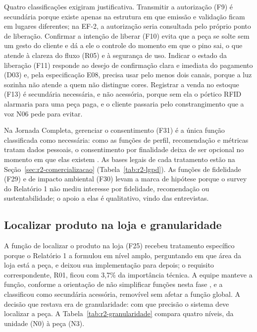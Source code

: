 Quatro classificações exigiram justificativa. Transmitir a autorização (F9) é secundária porque existe apenas na estrutura em que emissão e validação ficam em lugares diferentes; na EF-2, a autorização seria consultada pelo próprio ponto de liberação. Confirmar a intenção de liberar (F10) evita que a peça se solte sem um gesto do cliente e dá a ele o controle do momento em que o pino sai, o que atende à clareza do fluxo (R05) e à segurança de uso. Indicar o estado da liberação (F11) responde ao desejo de confirmação clara e imediata do pagamento (D03) e, pela especificação E08, precisa usar pelo menos dois canais, porque a luz sozinha não atende a quem não distingue cores. Registrar a venda no estoque (F13) é secundária necessária, e não acessória, porque sem ela o pórtico RFID alarmaria para uma peça paga, e o cliente passaria pelo constrangimento que a voz N06 pede para evitar.

Na Jornada Completa, gerenciar o consentimento (F31) é a única função classificada como necessária: como as funções de perfil, recomendação e métricas tratam dados pessoais, o consentimento por finalidade deixa de ser opcional no momento em que elas existem \cite{brasil2018lgpd}. As bases legais de cada tratamento estão na Seção~\ref{sec:r2-comercializacao} (Tabela~\ref{tab:r2-lgpd}). As funções de fidelidade (F29) e de impacto ambiental (F30) levam a marca de hipótese porque o survey do Relatório 1 não mediu interesse por fidelidade, recomendação ou sustentabilidade; o apoio a elas é qualitativo, vindo das entrevistas.

\subsection{Localizar produto na loja e granularidade}
\label{sub:r2-localizar}

A função de localizar o produto na loja (F25) recebeu tratamento específico porque o Relatório 1 a formulou em nível amplo, perguntando em que área da loja está a peça, e deixou sua implementação para depois; o requisito correspondente, R01, ficou com 3,7\% da importância técnica. A equipe manteve a função, conforme a orientação de não simplificar funções nesta fase \cite{zancul2026conceitual}, e a classificou como secundária acessória, removível sem afetar a função global. A decisão que restava era de granularidade: com que precisão o sistema deve localizar a peça. A Tabela~\ref{tab:r2-granularidade} compara quatro níveis, da unidade (N0) à peça (N3).

